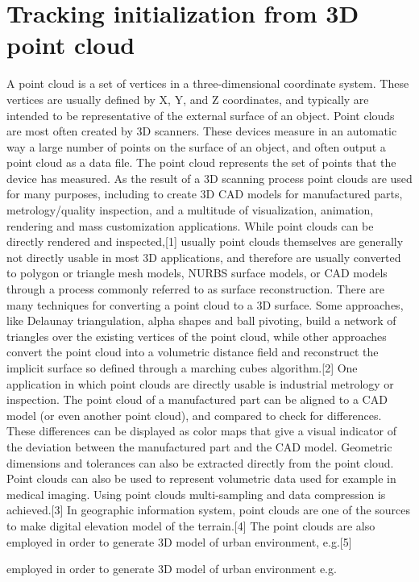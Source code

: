 \section{Tracking initialization from 3D point cloud}
\label{sec:tifpc}
A point cloud is a set of vertices in a three-dimensional coordinate system. These vertices are usually defined by X, Y, and Z coordinates, and typically are intended to be representative of the external surface of an object.
Point clouds are most often created by 3D scanners. These devices measure in an automatic way a large number of points on the surface of an object, and often output a point cloud as a data file. The point cloud represents the set of points that the device has measured.
As the result of a 3D scanning process point clouds are used for many purposes, including to create 3D CAD models for manufactured parts, metrology/quality inspection, and a multitude of visualization, animation, rendering and mass customization applications.
While point clouds can be directly rendered and inspected,[1] usually point clouds themselves are generally not directly usable in most 3D applications, and therefore are usually converted to polygon or triangle mesh models, NURBS surface models, or CAD models through a process commonly referred to as surface reconstruction. There are many techniques for converting a point cloud to a 3D surface. Some approaches, like Delaunay triangulation, alpha shapes and ball pivoting, build a network of triangles over the existing vertices of the point cloud, while other approaches convert the point cloud into a volumetric distance field and reconstruct the implicit surface so defined through a marching cubes algorithm.[2]
One application in which point clouds are directly usable is industrial metrology or inspection. The point cloud of a manufactured part can be aligned to a CAD model (or even another point cloud), and compared to check for differences. These differences can be displayed as color maps that give a visual indicator of the deviation between the manufactured part and the CAD model. Geometric dimensions and tolerances can also be extracted directly from the point cloud.
Point clouds can also be used to represent volumetric data used for example in medical imaging. Using point clouds multi-sampling and data compression is achieved.[3]
In geographic information system, point clouds are one of the sources
to make digital elevation model of the terrain.[4] The point clouds
are also employed in order to generate 3D model of urban environment,
e.g.[5]

employed in order to generate 3D model of urban environment e.g.



